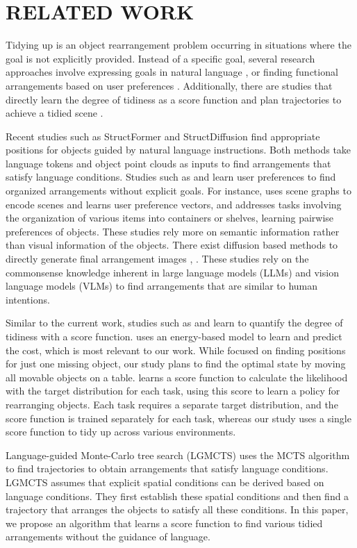 \section{RELATED WORK}
Tidying up is an object rearrangement problem occurring in situations where the goal is not explicitly provided. 
Instead of a specific goal, several research approaches involve expressing goals in natural language \cite{StructFormer, StructDiffusion, LGMCTS}, 
or finding functional arrangements based on user preferences \cite{myhouse, RobotOrganize}.
Additionally, there are studies that directly learn the degree of tidiness as a score function and plan trajectories to achieve a tidied scene \cite{SceneScore, TarGF}.

Recent studies such as StructFormer \cite{StructFormer} and StructDiffusion \cite{StructDiffusion} find appropriate positions for objects guided by natural language instructions. 
Both methods take language tokens and object point clouds as inputs to find arrangements that satisfy language conditions. 
Studies such as \cite{myhouse} and \cite{RobotOrganize} learn user preferences to find organized arrangements without explicit goals.
For instance, \cite{myhouse} uses scene graphs to encode scenes and learns user preference vectors, 
and \cite{RobotOrganize} addresses tasks involving the organization of various items into containers or shelves, learning pairwise preferences of objects. %
These studies rely more on semantic information rather than visual information of the objects.
There exist diffusion based methods to directly generate final arrangement images \cite{DalleBot}, \cite{LVDiffuser}.
These studies rely on the commonsense knowledge inherent in large language models (LLMs) and vision language models (VLMs) to find arrangements that are similar to human intentions. 

Similar to the current work, studies such as \cite{SceneScore} and \cite{TarGF} learn to quantify the degree of tidiness with a score function. 
\cite{SceneScore} uses an energy-based model to learn and predict the cost, which is most relevant to our work. 
While \cite{SceneScore} focused on finding positions for just one missing object, our study plans to find the optimal state by moving all movable objects on a table. 
\cite{TarGF} learns a score function to calculate the likelihood with the target distribution for each task, using this score to learn a policy for rearranging objects. 
Each task requires a separate target distribution, and the score function is trained separately for each task, whereas our study uses a single score function to tidy up across various environments.

Language-guided Monte-Carlo tree search (LGMCTS) \cite{LGMCTS} uses the MCTS algorithm to find trajectories to obtain arrangements that satisfy language conditions. 
LGMCTS assumes that explicit spatial conditions can be derived based on language conditions. 
They first establish these spatial conditions and then find a trajectory that arranges the objects to satisfy all these conditions. 
In this paper, we propose an algorithm that learns a score function to find various tidied arrangements without the guidance of language.